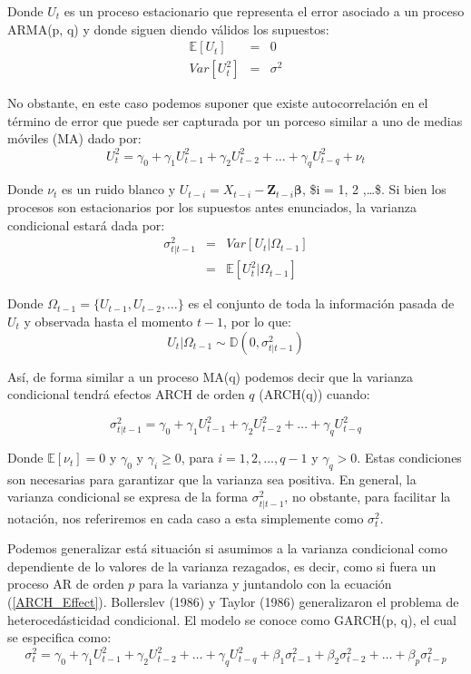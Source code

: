 \documentclass[
  a4paper,
]{article}
\begin{document}
Donde \(U_t\) es un proceso estacionario que representa el error
asociado a un proceso ARMA(p, q) y donde siguen diendo válidos los
supuestos: \begin{eqnarray*}
    \mathbb{E}[U_t] & = & 0 \\
    Var[U_t^2] & = & \sigma^2
\end{eqnarray*}

No obstante, en este caso podemos suponer que existe autocorrelación en
el término de error que puede ser capturada por un porceso similar a uno
de medias móviles (MA) dado por: \[
    U_t^2 = \gamma_0 + \gamma_1 U_{t-1}^2 + \gamma_2 U_{t-2}^2 + \ldots + \gamma_q U_{t-q}^2 + \nu_t
\]

Donde \(\nu_t\) es un ruido blanco y
\(U_{t-i} = X_{t-i} - \mathbf{Z}_{t-i} \boldsymbol{\beta}\), \$i = 1, 2
,\ldots \$. Si bien los procesos son estacionarios por los supuestos
antes enunciados, la varianza condicional estará dada por:
\begin{eqnarray*}
    \sigma^2_{t | t-1} & = & Var[ U_t | \Omega_{t-1} ] \\
    & = & \mathbb{E}[ U^2_t | \Omega_{t-1} ]
\end{eqnarray*}

Donde \(\Omega_{t-1} = \{U_{t-1}, U_{t-2}, \ldots \}\) es el conjunto de
toda la información pasada de \(U_t\) y observada hasta el momento
\(t-1\), por lo que: \begin{equation*}
    U_t | \Omega_{t-1} \sim \mathbb{D}(0, \sigma^2_{t | t-1})
\end{equation*}

Así, de forma similar a un proceso MA(q) podemos decir que la varianza
condicional tendrá efectos ARCH de orden \(q\) (ARCH(q)) cuando:

\[
  \sigma^2_{t|t-1} = \gamma_0 + \gamma_1 U_{t-1}^2 + \gamma_2 U_{t-2}^2 + \ldots + \gamma_q U_{t-q}^2
    \label{ARCH_Effect}
\]

Donde \(\mathbb{E}[\nu_t] = 0\) y \(\gamma_0\) y \(\gamma_i \geq 0\),
para \(i = 1, 2, \ldots, q-1\) y \(\gamma_q > 0\). Estas condiciones son
necesarias para garantizar que la varianza sea positiva. En general, la
varianza condicional se expresa de la forma \(\sigma^2_{t | t-1}\), no
obstante, para facilitar la notación, nos referiremos en cada caso a
esta simplemente como \(\sigma^2_{t}\).

Podemos generalizar está situación si asumimos a la varianza condicional
como dependiente de lo valores de la varianza rezagados, es decir, como
si fuera un proceso AR de orden \(p\) para la varianza y juntandolo con
la ecuación (\ref{ARCH_Effect}). Bollerslev (1986) y Taylor (1986)
generalizaron el problema de heterocedásticidad condicional. El modelo
se conoce como GARCH(p, q), el cual se especifica como: \[
    \sigma^2_t = \gamma_0 + \gamma_1 U_{t-1}^2 + \gamma_2 U_{t-2}^2 + \ldots + \gamma_q U_{t-q}^2 + \beta_1 \sigma^2_{t-1} + \beta_2 \sigma^2_{t-2} + \ldots + \beta_p \sigma^2_{t-p}
    \label{GARCH_Effect}
\]
\end{document}
